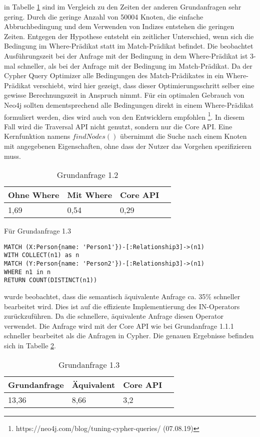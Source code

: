   in Tabelle \ref{tab:Query1_2} sind im Vergleich zu den Zeiten der anderen Grundanfragen sehr gering. Durch die geringe Anzahl von 50004 Knoten, die einfache Abbruchbedingung und dem Verwenden von Indizes entstehen die geringen Zeiten. \newline Entgegen der Hypothese entsteht ein zeitlicher Unterschied, wenn sich die Bedingung im Where-Prädikat statt im Match-Prädikat 	befindet. Die beobachtet Ausführungszeit bei der Anfrage mit der Bedingung in dem Where-Prädikat ist 3-mal schneller, als bei der Anfrage mit der Bedingung im Match-Prädikat. Da der Cypher Query Optimizer alle Bedingungen des Match-Prädikates in ein Where-Prädikat verschiebt, wird hier gezeigt, dass dieser Optimierungsschritt selber eine gewisse Berechnungszeit in Anspruch nimmt. Für ein optimalen Gebrauch von Neo4j sollten dementsprechend alle Bedingungen direkt in einem Where-Prädikat formuliert werden, dies wird auch von den Entwicklern empfohlen \footnote{https://neo4j.com/blog/tuning-cypher-queries/ (07.08.19)}. \newline
In diesem Fall wird die Traversal API nicht genutzt, sondern nur die Core API. Eine Kernfunktion namens $findNodes()$ übernimmt die Suche nach einem Knoten mit angegebenen Eigenschaften, ohne dass der Nutzer das Vorgehen spezifizieren muss.  
\FloatBarrier
\begin{table}[h]
	\centering
		\begin{tabular}{ |p{3cm}|p{3cm}|p{3cm}|p{3cm}|  }
			\hline
			Ohne Where& Mit Where& Core API  \\
			\hline
			1,69   &  0,54  & 0,29  \\
			\hline
		\end{tabular}
		\FloatBarrier
		\caption{Grundanfrage 1.2}
		\label{tab:Query1_2}
\end{table}
\FloatBarrier
\noindent Für Grundanfrage 1.3
\begin{Verbatim}[frame=single]
MATCH (X:Person{name: 'Person1'})-[:Relationship3]->(n1) 
WITH COLLECT(n1) as n 
MATCH (Y:Person{name: 'Person2'})-[:Relationship3]->(n1) 
WHERE n1 in n
RETURN COUNT(DISTINCT(n1))
\end{Verbatim} 
 wurde beobachtet, dass die semantisch äquivalente Anfrage ca. 35\% schneller bearbeitet wird. Dies ist auf die effiziente Implementierung des IN-Operators zurückzuführen. Da die schnellere, äquivalente Anfrage diesen Operator verwendet. Die Anfrage wird mit der Core API wie bei Grundanfrage 1.1.1 schneller bearbeitet als die Anfragen in Cypher.
Die genauen Ergebnisse befinden sich in Tabelle	\ref{tab:Query1_3}.
\FloatBarrier
\begin{table}[h]
	\centering
		\begin{tabular}{ |p{3cm}|p{3cm}|p{3cm}|p{3cm}|  }
			\hline
			Grundanfrage & Äquivalent&Core API\\
			\hline
			 13,36    & 8,66 &  3,2\\
			\hline
		\end{tabular}
		\caption{Grundanfrage 1.3}
		\label{tab:Query1_3}
\end{table}
\FloatBarrier

